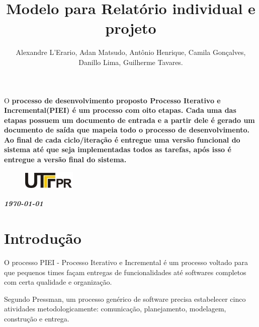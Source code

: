 \documentclass[	DIV=calc,%
							paper=a4,%
							fontsize=12pt,%
							onecolumn]{scrartcl}	 					%
\title{Modelo para Relatório individual e projeto}					%
\author{Alexandre L'Erario, Adan Matsudo, Antônio Henrique, Camila Gonçalves, Danillo Lima, Guilherme Tavares.}  	%
\date{}																				%
\newcommand{\initial}[1]{%
     \lettrine[lines=3,lhang=0.3,nindent=0em]{
     				\color{DarkGoldenrod}
     				{\textsf{#1}}}{}}
\begin{document}
\maketitle
\thispagestyle{fancy} 	
\thispagestyle{empty}		%




\initial{O}\textbf{ processo de desenvolvimento proposto Processo Iterativo e Incremental(PIEI) é um processo com oito etapas. Cada uma das etapas possuem um documento de entrada e a partir dele é gerado um documento de saída que mapeia todo o processo de desenvolvimento. Ao final de cada ciclo/iteração é entregue uma versão funcional do sistema até que seja implementadas todos as tarefas, após isso é entregue a versão final do sistema. }

\begin{figure}
	\centering
	\includegraphics{utfpr}
\end{figure}

\vspace{3cm}
\centerline{\textit{\textbf{\today}}}

\clearpage
    \renewcommand*\listfigurename{Lista de figuras}
\listoffigures

\renewcommand*\listtablename{Lista de tabelas}
\listoftables

\clearpage
\renewcommand{\contentsname}{Sumário}
\tableofcontents
\clearpage

\section{Introdução}
O processo PIEI - Processo Iterativo e Incremental é um processo voltado para que pequenos times façam entregas de funcionalidades até softwares completos com certa qualidade e organização.

Segundo Pressman\cite{pressman:14}, um processo genérico de software precisa estabelecer cinco atividades metodologicamente: comunicação, planejamento, modelagem, construção e entrega. 
\end{document}
